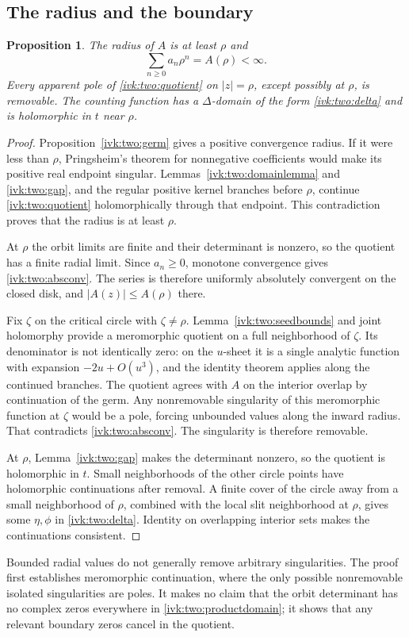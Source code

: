 \documentclass[11pt,letterpaper]{article}
\newtheorem{proposition}[theorem]{Proposition}
\theoremstyle{remark}\newtheorem{remark}[theorem]{Remark}
\begin{document}
\subsection{The radius and the boundary}
\begin{proposition}\label{ivk:two:boundary}
The radius of $A$ is at least $\rho$ and
\begin{equation}\label{ivk:two:absconv}
 \sum_{n\ge0}a_n\rho^n=A(\rho)<\infty.
\end{equation}
Every apparent pole of \eqref{ivk:two:quotient} on $|z|=\rho$, except possibly
at $\rho$, is removable. The counting function has a $\Delta$-domain
of the form \eqref{ivk:two:delta} and is holomorphic in $t$ near $\rho$.
\end{proposition}
\begin{proof}
Proposition~\ref{ivk:two:germ} gives a positive convergence radius. If it were
less than $\rho$, Pringsheim's theorem for nonnegative coefficients
would make its positive real endpoint singular. Lemmas~\ref{ivk:two:domainlemma}
and \ref{ivk:two:gap}, and the regular positive kernel branches before $\rho$,
continue \eqref{ivk:two:quotient} holomorphically through that endpoint. This
contradiction proves that the radius is at least $\rho$.

At $\rho$ the orbit limits are finite and their determinant is nonzero,
so the quotient has a finite radial limit. Since $a_n\ge0$, monotone
convergence gives \eqref{ivk:two:absconv}. The series is therefore uniformly
absolutely convergent on the closed disk, and
$|A(z)|\le A(\rho)$ there.

Fix $\zeta$ on the critical circle with $\zeta\ne\rho$.
Lemma~\ref{ivk:two:seedbounds} and joint holomorphy provide a meromorphic
quotient on a full neighborhood of $\zeta$. Its denominator is not
identically zero: on the $u$-sheet it is a single analytic function
with expansion $-2u+O(u^3)$, and the identity theorem applies along
the continued branches. The quotient agrees with $A$ on the interior
overlap by continuation of the germ. Any nonremovable singularity
of this meromorphic function at $\zeta$ would be a pole, forcing
unbounded values along the inward radius. That contradicts
\eqref{ivk:two:absconv}. The singularity is therefore removable.

At $\rho$, Lemma~\ref{ivk:two:gap} makes the determinant nonzero, so the
quotient is holomorphic in $t$. Small neighborhoods of the other
circle points have holomorphic continuations after removal. A finite
cover of the circle away from a small neighborhood of $\rho$, combined
with the local slit neighborhood at $\rho$, gives some $\eta,\phi$
in \eqref{ivk:two:delta}. Identity on overlapping interior sets makes the
continuations consistent.
\end{proof}
Bounded radial values do not generally remove arbitrary singularities.
The proof first establishes meromorphic continuation, where the only
possible nonremovable isolated singularities are poles. It makes no
claim that the orbit determinant has no complex zeros everywhere in
\eqref{ivk:two:productdomain}; it shows that any relevant boundary zeros
cancel in the quotient.
\end{document}
